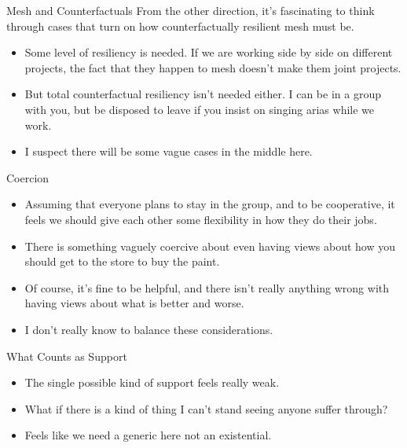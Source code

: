 \documentclass[
  ignorenonframetext,
]{beamer}
\providecommand{\tightlist}{%
  \setlength{\itemsep}{0pt}\setlength{\parskip}{0pt}}
\begin{document}
\begin{frame}{Mesh and Counterfactuals}
\protect\hypertarget{mesh-and-counterfactuals}{}
From the other direction, it's fascinating to think through cases that
turn on how counterfactually resilient mesh must be.

\begin{itemize}
\tightlist
\item
  Some level of resiliency is needed. If we are working side by side on
  different projects, the fact that they happen to mesh doesn't make
  them joint projects.
\item
  But total counterfactual resiliency isn't needed either. I can be in a
  group with you, but be disposed to leave if you insist on singing
  arias while we work.
\item
  I suspect there will be some vague cases in the middle here.
\end{itemize}
\end{frame}

\begin{frame}{Coercion}
\protect\hypertarget{coercion}{}
\begin{itemize}
\tightlist
\item
  Assuming that everyone plans to stay in the group, and to be
  cooperative, it feels we should give each other some flexibility in
  how they do their jobs.
\item
  There is something vaguely coercive about even having views about how
  you should get to the store to buy the paint.
\item
  Of course, it's fine to be helpful, and there isn't really anything
  wrong with having views about what is better and worse.
\item
  I don't really know to balance these considerations.
\end{itemize}
\end{frame}

\begin{frame}{What Counts as Support}
\protect\hypertarget{what-counts-as-support}{}
\begin{itemize}
\tightlist
\item
  The single possible kind of support feels really weak.
\item
  What if there is a kind of thing I can't stand seeing anyone suffer
  through?
\item
  Feels like we need a generic here not an existential.
\end{itemize}
\end{frame}
\end{document}
